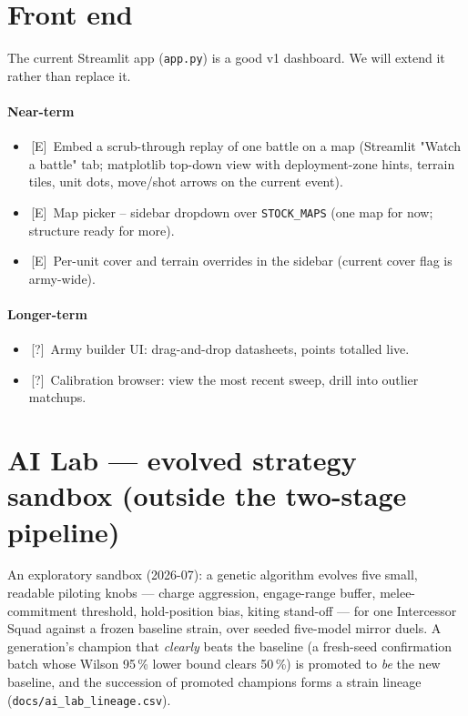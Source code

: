 \documentclass[11pt,a4paper]{article}
\newcommand{\eddie}{\textcolor{eddieblue}{\textsf{[E]}}}
\newcommand{\either}{\textcolor{eithergrey}{\textsf{[?]}}}
\newcommand{\todo}{\ding{109}\,}    %
\newcommand{\done}{\ding{51}\,}     %
\begin{document}
\section{Front end}
\label{sec:front-end}

The current Streamlit app (\texttt{app.py}) is a good v1 dashboard. We
will extend it rather than replace it.

\paragraph{Near-term}
\begin{itemize}[label={},leftmargin=*,itemsep=2pt]
  \item \done \eddie\ Embed a scrub-through replay of one battle on a
    map (Streamlit "Watch a battle" tab; matplotlib top-down view with
    deployment-zone hints, terrain tiles, unit dots, move/shot arrows
    on the current event).
  \item \done \eddie\ Map picker -- sidebar dropdown over
    \texttt{STOCK\_MAPS} (one map for now; structure ready for more).
  \item \todo \eddie\ Per-unit cover and terrain overrides in the
    sidebar (current cover flag is army-wide).
\end{itemize}

\paragraph{Longer-term}
\begin{itemize}[label={},leftmargin=*,itemsep=2pt]
  \item \todo \either\ Army builder UI: drag-and-drop datasheets, points
    totalled live.
  \item \todo \either\ Calibration browser: view the most recent sweep,
    drill into outlier matchups.
\end{itemize}

\section{AI Lab --- evolved strategy sandbox (outside the two-stage pipeline)}
\label{sec:ai-lab}

An exploratory sandbox (2026-07): a genetic algorithm evolves five small,
readable piloting knobs --- charge aggression, engage-range buffer,
melee-commitment threshold, hold-position bias, kiting stand-off --- for
one Intercessor Squad against a frozen baseline strain, over seeded
five-model mirror duels. A generation's champion that \emph{clearly} beats
the baseline (a fresh-seed confirmation batch whose Wilson 95\,\% lower
bound clears 50\,\%) is promoted to \emph{be} the new baseline, and the
succession of promoted champions forms a strain lineage
(\texttt{docs/ai\_lab\_lineage.csv}).
\end{document}
